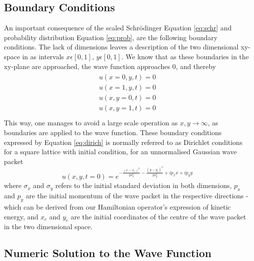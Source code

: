 \documentclass[10pt, nofootinbib, twocolumn]{revtex4-1}
\begin{document}
\subsection{Boundary Conditions}
An important consequence of the scaled Schrödinger Equation \eqref{eq:schr} and probability distribution Equation \eqref{eq:prob}, are the following boundary conditions. The lack of dimensions leaves a description of the two dimensional xy-space in as intervals $x\epsilon[0,1]$, $y\epsilon[0,1]$. We know that as these boundaries in the xy-plane are approached, the wave function approaches 0, and thereby
\begin{align}\label{eq:dirich}
    \begin{split}
        u(x=0,y,t)=0 \\
        u(x=1,y,t)=0 \\
        u(x,y=0,t)=0 \\
        u(x,y=1,t)=0 \\
    \end{split}
\end{align}
This way, one manages to avoid a large scale operation as $x,y \longrightarrow \infty$, as boundaries are applied to the wave function. These boundary conditions expressed by Equation \eqref{eq:dirich} is normally referred to as Dirichlet conditions \cite[p. ~333]{notes} for a square lattice with initial condition, for an unnormalised Gaussian wave packet
\begin{equation}\label{eq:init}
    u(x,y,t=0) = e^{-\frac{(x-x_c)^2}{2 \sigma_x^2} - \frac{(y-y_c)^2}{2 \sigma_y^2} + i p_x x + i p_y y}
\end{equation}
where $\sigma_x$ and $\sigma_y$ refers to the initial standard deviation in both dimensions, $p_x$ and $p_y$ are the initial momentum of the wave packet in the respective directions - which can be derived from our Hamiltonian operator's expression of kinetic energy, and $x_c$ and $y_c$ are the initial coordinates of the centre of the wave packet in the two dimensional space.




\subsection{Numeric Solution to the Wave Function}
\end{document}
